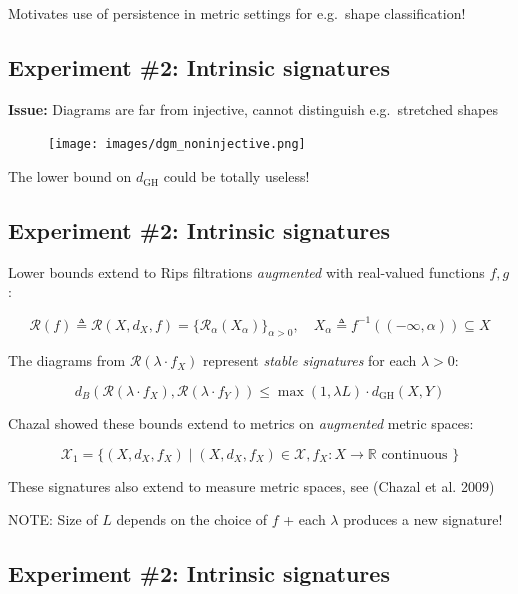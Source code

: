 \documentclass[
  letterpaper,
  DIV=11,
  numbers=noendperiod,
  oneside]{scrartcl}
\begin{document}
Motivates use of persistence in metric settings for e.g.~shape
classification!

\subsection{Experiment \#2: Intrinsic
signatures}\label{experiment-2-intrinsic-signatures-3}

\textbf{Issue:} Diagrams are far from injective, cannot distinguish
e.g.~stretched shapes

\begin{figure}

{\centering \texttt{[image: images/dgm\_noninjective.png]}

}

\end{figure}

The lower bound on \(d_{\mathrm{GH}}\) could be totally useless!

\subsection{Experiment \#2: Intrinsic
signatures}\label{experiment-2-intrinsic-signatures-4}

Lower bounds extend to Rips filtrations \emph{augmented} with
real-valued functions \(f, g\):

\[
\mathcal{R}(f) \triangleq \mathcal{R}(X, d_X, f) = \{\mathcal{R}_\alpha(X_\alpha)\}_{\alpha > 0}, \quad X_\alpha \triangleq f^{-1}((-\infty, \alpha)) \subseteq X
\]

The diagrams from \(\mathcal{R}(\lambda \cdot f_X)\) represent
\emph{stable signatures} for each \(\lambda > 0\):

\[
d_B(\mathcal{R}(\lambda \cdot f_X), \mathcal{R}(\lambda \cdot f_Y)) \leq \max(1, \lambda L) \cdot d_{\mathrm{GH}}(X, Y)
\]

Chazal showed these bounds extend to metrics on \emph{augmented} metric
spaces:

\[
\mathcal{X}_1 = \{ (X, d_X, f_X) \mid (X, d_X, f_X) \in \mathcal{X}, f_X: X \to \mathbb{R} \text{ continuous }\}
\]

These signatures also extend to measure metric spaces, see (Chazal et
al. 2009)

{ NOTE: } Size of \(L\) depends on the choice of \(f\) + each
\(\lambda\) produces a new signature!

\subsection{Experiment \#2: Intrinsic
signatures}\label{experiment-2-intrinsic-signatures-5}
\end{document}
